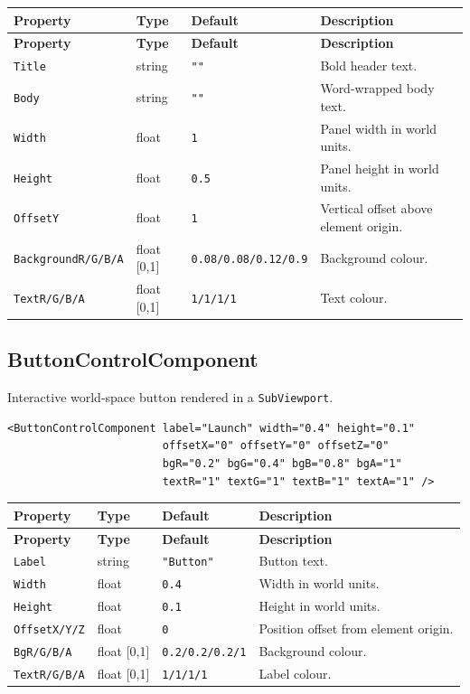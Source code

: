 \documentclass[11pt,a4paper]{article}
\begin{document}
\begin{longtable}{P{3.8cm} P{2cm} P{2cm} P{5.2cm}}
  \toprule
  \textbf{Property} & \textbf{Type} & \textbf{Default} & \textbf{Description} \\
  \midrule
  \endfirsthead
  \toprule
  \textbf{Property} & \textbf{Type} & \textbf{Default} & \textbf{Description} \\
  \midrule
  \endhead
  \texttt{Title} & string & \texttt{""} & Bold header text. \\
  \texttt{Body} & string & \texttt{""} & Word-wrapped body text. \\
  \texttt{Width} & float & \texttt{1} & Panel width in world units. \\
  \texttt{Height} & float & \texttt{0.5} & Panel height in world units. \\
  \texttt{OffsetY} & float & \texttt{1} & Vertical offset above element origin. \\
  \texttt{BackgroundR/G/B/A} & float [0,1] &
    \texttt{0.08/0.08/0.12/0.9} & Background colour. \\
  \texttt{TextR/G/B/A} & float [0,1] & \texttt{1/1/1/1} & Text colour. \\
  \bottomrule
\end{longtable}

\subsection{ButtonControlComponent}

Interactive world-space button rendered in a \texttt{SubViewport}.

\begin{lstlisting}
<ButtonControlComponent label="Launch" width="0.4" height="0.1"
                        offsetX="0" offsetY="0" offsetZ="0"
                        bgR="0.2" bgG="0.4" bgB="0.8" bgA="1"
                        textR="1" textG="1" textB="1" textA="1" />
\end{lstlisting}

\begin{longtable}{P{3.5cm} P{2cm} P{2.2cm} P{5.3cm}}
  \toprule
  \textbf{Property} & \textbf{Type} & \textbf{Default} & \textbf{Description} \\
  \midrule
  \endfirsthead
  \toprule
  \textbf{Property} & \textbf{Type} & \textbf{Default} & \textbf{Description} \\
  \midrule
  \endhead
  \texttt{Label} & string & \texttt{"Button"} & Button text. \\
  \texttt{Width} & float & \texttt{0.4} & Width in world units. \\
  \texttt{Height} & float & \texttt{0.1} & Height in world units. \\
  \texttt{OffsetX/Y/Z} & float & \texttt{0} & Position offset from element origin. \\
  \texttt{BgR/G/B/A} & float [0,1] & \texttt{0.2/0.2/0.2/1} & Background colour. \\
  \texttt{TextR/G/B/A} & float [0,1] & \texttt{1/1/1/1} & Label colour. \\
  \bottomrule
\end{longtable}
\end{document}
